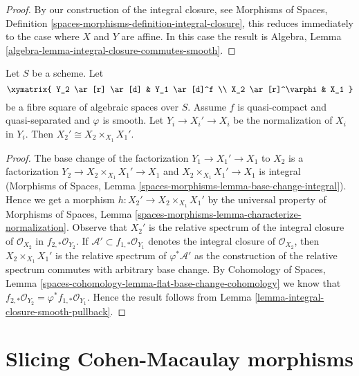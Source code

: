 \begin{proof}
By our construction of the integral closure, see
Morphisms of Spaces, Definition
\ref{spaces-morphisms-definition-integral-closure},
this reduces immediately to the case where $X$ and $Y$ are affine.
In this case the result is
Algebra, Lemma \ref{algebra-lemma-integral-closure-commutes-smooth}.
\end{proof}

\begin{lemma}
\label{lemma-normalization-smooth-localization}
Let $S$ be a scheme. Let
$$
\xymatrix{
Y_2 \ar[r] \ar[d] & Y_1 \ar[d]^f \\
X_2 \ar[r]^\varphi & X_1
}
$$
be a fibre square of algebraic spaces over $S$. Assume $f$ is quasi-compact
and quasi-separated and $\varphi$ is smooth.
Let $Y_i \to X_i' \to X_i$ be the normalization of $X_i$ in $Y_i$.
Then $X_2' \cong X_2 \times_{X_1} X_1'$.
\end{lemma}

\begin{proof}
The base change of the factorization $Y_1 \to X_1' \to X_1$ to $X_2$
is a factorization $Y_2 \to X_2 \times_{X_1} X_1' \to X_1$ and
$X_2 \times_{X_1} X_1' \to X_1$ is integral
(Morphisms of Spaces, Lemma \ref{spaces-morphisms-lemma-base-change-integral}).
Hence we get a morphism
$h : X_2' \to X_2 \times_{X_1} X_1'$ by the universal property of
Morphisms of Spaces, Lemma
\ref{spaces-morphisms-lemma-characterize-normalization}.
Observe that $X_2'$ is the relative spectrum of the integral closure
of $\mathcal{O}_{X_2}$ in $f_{2, *}\mathcal{O}_{Y_2}$.
If $\mathcal{A}' \subset f_{1, *}\mathcal{O}_{Y_1}$ denotes the integral
closure of $\mathcal{O}_{X_2}$, then $X_2 \times_{X_1} X_1'$ is the
relative spectrum of $\varphi^*\mathcal{A}'$ as the construction of
the relative spectrum commutes with arbitrary base change. By
Cohomology of Spaces, Lemma
\ref{spaces-cohomology-lemma-flat-base-change-cohomology}
we know that $f_{2, *}\mathcal{O}_{Y_2} = \varphi^*f_{1, *}\mathcal{O}_{Y_1}$.
Hence the result follows from
Lemma \ref{lemma-integral-closure-smooth-pullback}.
\end{proof}







\section{Slicing Cohen-Macaulay morphisms}
\label{section-slice}

